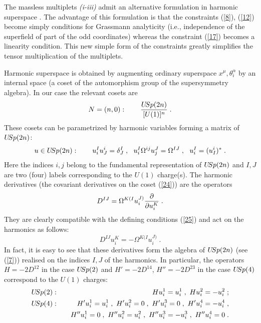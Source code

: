 \documentclass[a4paper,12pt]{article}
\begin{document}
The massless multiplets {\sl (i-iii)} admit an alternative 
formulation in harmonic superspace \cite{GIKOS,HStT,Howe}. The advantage of 
this formulation is that the constraints (\ref{8}), (\ref{12}) 
become simply conditions for Grassmann analyticity (i.e., 
independence of the superfield of part of the odd coordinates) 
whereas the constraint (\ref{17}) becomes a linearity condition. 
This new simple form of the constraints greatly simplifies the 
tensor multiplication of the multiplets. 

Harmonic superspace is obtained by augmenting ordinary superspace 
$x^\mu,\theta^\alpha_i$ by an internal space (a coset of the 
automorphism group of the supersymmetry algebra). In our case the 
relevant cosets are
\begin{equation}\label{24}
  N=(n,0):\qquad {U\hskip-2pt Sp(2n)\over [U(1)]^n}\;.
\end{equation}
These cosets can be parametrized by harmonic variables forming a 
matrix of $U\hskip-2pt Sp(2n)$: 
\begin{equation}\label{25}
  u\in U\hskip-2pt Sp(2n): \qquad u^I_iu^i_J = \delta^I_J\;, 
\ \ u^I_i \Omega^{ij}u^J_j = \Omega^{IJ}\;, \ \  u^I_i= 
(u^i_I)^*\;. 
\end{equation}
Here the indices $i,j$ belong to the fundamental representation of  
$U\hskip-2pt Sp(2n)$ and $I,J$ are two (four) labels corresponding 
to the $U(1)$ charge(s). The harmonic derivatives (the covariant 
derivatives on the coset (\ref{24})) are the operators 
\begin{equation}\label{26}
  D^{IJ} = \Omega^{K(I}u^{J)}_i{\partial\over\partial u^K_i}\;.
\end{equation}
They are clearly compatible with the defining conditions 
(\ref{25}) and act on the harmonics as follows:
\begin{equation}\label{27}
   D^{IJ}u^K_i = -\Omega^{K(I}u^{J)}_i\;.
\end{equation}
In fact, it is easy to see that these derivatives form the algebra 
of $U\hskip-2pt Sp(2n)$ (see (\ref{7})) realised on the indices 
$I,J$ of the harmonics. In particular, the operators $H=-2D^{12}$ 
in the case $U\hskip-2pt Sp(2)$ and $H'=-2D^{14}$, $H''=-2D^{23}$ 
in the case $U\hskip-2pt Sp(4)$ correspond to the $U(1)$ charges: 
\begin{eqnarray}
 U\hskip-2pt Sp(2): &\quad& Hu^1_i=u^1_i\;, \ Hu^2_i=-u^2_i\;; \label{28'}\\
 U\hskip-2pt Sp(4): &\quad& H'u^1_i=u^1_i\;, \ H'u^2_i=0\;, \ H'u^3_i=0\;, \ H'u^4_i=-u^4_i\;, 
\nonumber \\ 
  &\quad& H''u^1_i=0\;, \ H''u^2_i=u^2_i\;, \ H''u^3_i=-u^3_i\;, \ H''u^4_i=0\;.  
 \label{28} 
\end{eqnarray}
\end{document}
